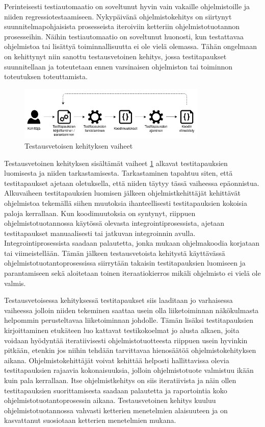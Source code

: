   Perinteisesti testiautomaatio on soveltunut hyvin vain vakaille ohjelmistoille ja niiden regressiotestaamiseen.
  Nykypäivänä ohjelmistokehitys on siirtynyt suunnitelmapohjaisista prosesseista iteroiviin ketteriin ohjelmistotuotannon prosesseihin.
  Näihin testiautomaatio on soveltunut huonosti, kun testattavaa ohjelmistoa tai lisättyä toiminnallisuutta ei ole vielä olemassa.
  Tähän ongelmaan on kehittynyt niin sanottu testausvetoinen kehitys, jossa testitapaukset suunnitellaan ja toteutetaan ennen varsinaisen ohjelmiston tai toiminnon toteutuksen toteuttamista.

  \begin{figure}[H]
    \centering
    \includegraphics[width=0.8\textwidth]{assets/testivetoinen-kehitys.png}
    \caption{Testausvetoisen kehityksen vaiheet}
    \label{fig:testivetoinen-kehitys}
  \end{figure}

  Testausvetoinen kehityksen sisältämät vaiheet \ref{fig:testivetoinen-kehitys} alkavat testitapauksien luomisesta ja niiden tarkastamisesta.
  Tarkastaminen tapahtuu siten, että testitapaukset ajetaan oletuksella, että niiden täytyy tässä vaiheessa epäonnistua.
  Alkuvaiheen testitapauksien luomisen jälkeen ohjelmistkehittäjät kehittävät ohjelmistoa tekemällä siihen muutoksia ihanteellisesti testitapauksien kokoisia paloja kerrallaan.
  Kun koodimuutoksia on syntynyt, riippuen ohjelmistotuotannossa käytössä olevasta integrointiprosessista, ajetaan testitapaukset manuaalisesti tai jatkuvan integroinnin avulla.
  Integrointiprosessista saadaan palautetta, jonka mukaan ohjelmakoodia korjataan tai viimeistellään.
  Tämän jälkeen testausvetoista kehitystä käyttävässä ohjelmistotuotantoprosessissa siirrytään takaisin testitapauksien luomiseen ja parantamiseen sekä aloitetaan toinen iteraatiokierros mikäli ohjelmisto ei vielä ole valmis.

  Testausvetoisessa kehityksessä testitapaukset siis laaditaan jo varhaisessa vaiheessa jolloin niiden tekeminen saattaa usein olla liiketoiminnan näkökulmasta helpommin perusteltavaa liiketoiminnan johdolle.
  Tämän lisäksi testitapauksien kirjoittaminen etukäteen luo kattavat testikokoelmat jo alusta alkaen, joita voidaan hyödyntää iteratiivisesti ohjelmistotuotteesta riippuen usein hyvinkin pitkään, etenkin jos niihin tehdään tarvittavaa hienosäätöä ohjelmistokehityksen aikana.
  Ohjelmistokehittäjät voivat kehittää helposti hallittavissa olevia testitapauksien rajaavia kokonaisuuksia, jolloin ohjelmistotuote valmistuu ikään kuin pala kerrallaan.
  Itse ohjelmistkehitys on siis iteratiivista ja näin ollen testitapauksien suorittamisesta saadaan palautetta ja raportointia koko ohjelmistotuotantoprosessin aikana.
  Testausvetoinen kehitys kuuluu ohjelmistotuotannossa vahvasti ketterien menetelmien alaisuuteen ja on kasvattanut suosiotaan ketterien menetelmien mukana.

